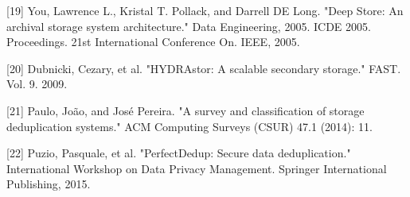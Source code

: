 [19] You, Lawrence L., Kristal T. Pollack, and Darrell DE Long. "Deep Store: An archival storage system architecture." Data Engineering, 2005. ICDE 2005. Proceedings. 21st International Conference On. IEEE, 2005.

[20] Dubnicki, Cezary, et al. "HYDRAstor: A scalable secondary storage." FAST. Vol. 9. 2009.

[21] Paulo, João, and José Pereira. "A survey and classification of storage deduplication systems." ACM Computing Surveys (CSUR) 47.1 (2014): 11.

[22] Puzio, Pasquale, et al. "PerfectDedup: Secure data deduplication." International Workshop on Data Privacy Management. Springer International Publishing, 2015.